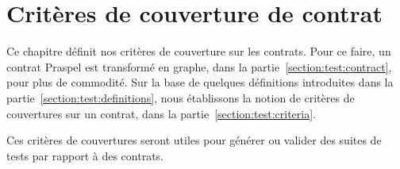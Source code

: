 \chapter{Critères de couverture de contrat}
\label{chapter:tests}

\mminitoc

Ce chapitre définit nos critères de couverture sur les contrats. Pour ce faire,
un contrat Praspel est transformé en graphe, dans la
partie~\ref{section:test:contract}, pour plus de commodité. Sur la base de
quelques définitions introduites dans la partie~\ref{section:test:definitions},
nous établissons la notion de critères de couvertures sur un contrat, dans la
partie~\ref{section:test:criteria}.

Ces critères de couvertures seront utiles pour générer ou valider des
suites de tests par rapport à des contrats.

